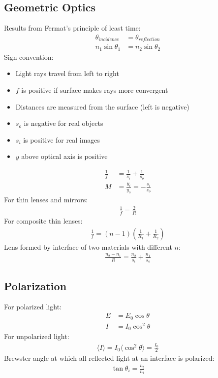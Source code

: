 \documentclass[11pt]{article}
\begin{document}
\begin{multicols*}{3}
\subsection{Geometric Optics}
Results from Fermat's principle of least time:
	\begin{align*}
	\theta_{incidence}&=\theta_{reflection} \\
	n_1\sin{\theta_1}&=n_2 \sin{\theta_2}
	\end{align*}
Sign convention:
\begin{itemize}
\item Light rays travel from left to right
\item $f$ is positive if surface makes rays more convergent 
\item Distances are measured from the surface (left is negative)
\item $s_o$ is negative for real objects
\item $s_i$ is positive for real images
\item $y$ above optical axis is positive
\end{itemize}
	\begin{align*}
	\frac{1}{f}&=\frac{1}{s_{i}}+\frac{1}{s_{o}} \\
	M&=\frac{y_i}{y_o}=-\frac{s_i}{s_o}
	\end{align*}
For thin lenses and mirrors:
	\begin{align*}
	\frac{1}{f} = \frac{2}{R}
	\end{align*}
For composite thin lenses:
	\begin{align*}
	\frac{1}{f} = (n-1)\left(\frac{1}{R_1} + \frac{1}{R_2}\right)
	\end{align*}
Lens formed by interface of two materials with different $n$:
	\begin{align*}
	\frac{n_2-n_1}{R} = \frac{n_2}{s_i} + \frac{n_1}{s_o}
	\end{align*}
\subsection{Polarization}
For polarized light:
	\begin{align*}
	E&=E_0\cos{\theta} \\
	I&=I_0\cos^2{\theta}
	\end{align*}
For unpolarized light:
	\begin{align*}
	\langle I \rangle=I_0 \langle \cos^2{\theta} \rangle = \frac{I_0}{2}
	\end{align*}
Brewster angle at which all reflected light at an interface is polarized:
	\begin{align*}
	\tan{\theta_i}=\frac{n_t}{n_i}
	\end{align*}

\end{multicols*}
\end{document}
